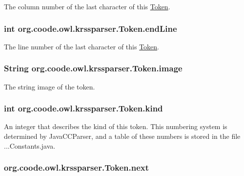The column number of the last character of this \hyperlink{classorg_1_1coode_1_1owl_1_1krssparser_1_1_token}{Token}. \hypertarget{classorg_1_1coode_1_1owl_1_1krssparser_1_1_token_a5e82cbcc59ce6058560d82b3ddfc8fb5}{
\subsubsection[{end\-Line}]{\setlength{\rightskip}{0pt plus 5cm}int org.\-coode.\-owl.\-krssparser.\-Token.\-end\-Line}}\label{classorg_1_1coode_1_1owl_1_1krssparser_1_1_token_a5e82cbcc59ce6058560d82b3ddfc8fb5}
The line number of the last character of this \hyperlink{classorg_1_1coode_1_1owl_1_1krssparser_1_1_token}{Token}. \hypertarget{classorg_1_1coode_1_1owl_1_1krssparser_1_1_token_aa8322c67e1704d675afc0c1aef9ad3eb}{
\subsubsection[{image}]{\setlength{\rightskip}{0pt plus 5cm}String org.\-coode.\-owl.\-krssparser.\-Token.\-image}}\label{classorg_1_1coode_1_1owl_1_1krssparser_1_1_token_aa8322c67e1704d675afc0c1aef9ad3eb}
The string image of the token. \hypertarget{classorg_1_1coode_1_1owl_1_1krssparser_1_1_token_a750503fccc1713c1af8c817d02b55231}{
\subsubsection[{kind}]{\setlength{\rightskip}{0pt plus 5cm}int org.\-coode.\-owl.\-krssparser.\-Token.\-kind}}\label{classorg_1_1coode_1_1owl_1_1krssparser_1_1_token_a750503fccc1713c1af8c817d02b55231}
An integer that describes the kind of this token. This numbering system is determined by Java\-C\-C\-Parser, and a table of these numbers is stored in the file ...Constants.\-java. \hypertarget{classorg_1_1coode_1_1owl_1_1krssparser_1_1_token_a5b33da5586b271319bf978fbe083a65d}{
\subsubsection[{next}]{ org.\-coode.\-owl.\-krssparser.\-Token.\-next}}\label{classorg_1_1coode_1_1owl_1_1krssparser_1_1_token_a5b33da5586b271319bf978fbe083a65d}
